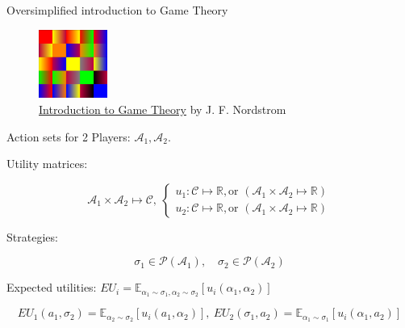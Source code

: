 \documentclass{beamer}
\theoremstyle{definition}
\begin{document}
\begin{frame}{Oversimplified introduction to Game Theory}

\begin{figure}
    \centering
    \includegraphics[width=0.2\textwidth]{img/GameTheoryLogo.png}
    \caption{\tiny \centering \href{https://nordstrommath.com/IntroGameTheoryv4-2020.pdf}{Introduction to Game Theory} by J. F. Nordstrom}
\end{figure}

Action sets for 2 Players: $\mathcal{A}_1, \mathcal{A}_2$.

Utility matrices:

\[
    \mathcal{A}_1 \times \mathcal{A}_2 \mapsto \mathcal{C}, \ 
    \begin{cases}
    u_1 : \mathcal{C} \mapsto \mathbb{R}, \text{or } (\mathcal{A}_1 \times \mathcal{A}_2 \mapsto \mathbb{R}) \\
    u_2 : \mathcal{C} \mapsto \mathbb{R}, \text{or } (\mathcal{A}_1 \times \mathcal{A}_2 \mapsto \mathbb{R})
\end{cases}
\]

Strategies:

\[
\sigma_1 \in \mathscr{P}(\mathcal{A}_1), \quad
\sigma_2 \in \mathscr{P}(\mathcal{A}_2)
\]

Expected utilities: $EU_i = \mathbb{E}_{\alpha_1 \sim \sigma_1, \alpha_2 \sim \sigma_2}[u_i(\alpha_1,\alpha_2)]$

\[
EU_1(a_1,\sigma_2) = \mathbb{E}_{\alpha_2 \sim \sigma_2}[u_i(a_1,\alpha_2)], \ 
EU_2(\sigma_1,a_2) = \mathbb{E}_{\alpha_1 \sim \sigma_1}[u_i(\alpha_1,a_2)]
\]

\end{frame}
\end{document}
